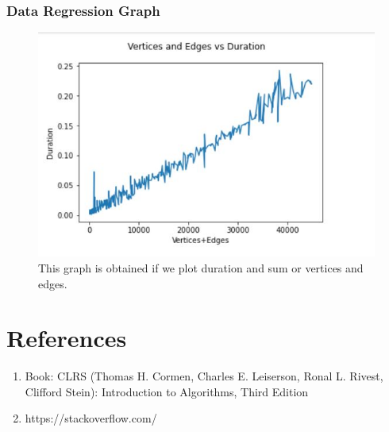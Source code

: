 \documentclass[12pt,runningheads]{article}
\begin{document}
\subsubsection{Data Regression Graph}
\begin{figure}[htp]
    \centering
    \includegraphics[width=12cm]{bfslinegraph.JPG}
    \caption{This graph is obtained if we plot duration and sum or vertices and edges.}
    \label{fig:galaxy}
\end{figure}
\section{References}
\begin{enumerate}
    \item Book: CLRS (Thomas H. Cormen, Charles E. Leiserson, Ronal L. Rivest, Clifford Stein): Introduction to Algorithms, Third Edition
    \item https://stackoverflow.com/
\end{enumerate}
\printbibliography
\end{document}

